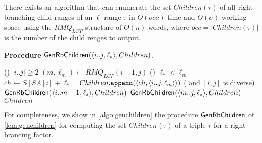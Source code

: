 \begin{lemma}\label{lem:genchildren}
  There exists an algorithm that can enumerate the set $Children(\tau)$ of all right-branching child ranges of an $\ell$-range $\tau$ in $O(occ)$ time and $O(\sigma)$ working space using the $RMQ_{LCP}$ structure of $O(n)$ words, 
where $occ = |Children(\tau)|$ is the number of the child renges to output.  
\end{lemma}

{
\setlength{\algotitleheightrule}{0pt}%
\begin{algorithm}[t]
  \caption{
    \textbf{Procedure} $\textsf{GenRbChildren}_{}(\langle i..j, \ell_*\rangle, Children)$.  
  }\label{algo:genchildren}
      \If  ()
           {$|i..j| \ge 2$}
      {
        $(m, \ell_m) \gets RMQ_{LCP}(i+1, j)$
        \uIf () {$\ell_* < \ell_m$}{
          $ch \gets S[SA[i]+\ell_*]$
          \label{line:genchildren:compute:ch}
          $Children.\mathtt{append}(\langle ch, \langle i..j, \ell_m\rangle\rangle)$
        }
        \Else  ( and $[i,j]$ is diverse) 
        {
          $\textsf{GenRbChildren}_{}(\langle i..m-1, \ell_*\rangle, Children)$\; 
          $\textsf{GenRbChildren}_{}(\langle m..j, \ell_*\rangle, Children)$\;
        }
      }
      \Return $Children$\;
\end{algorithm}
}

For completeness, we show in \cref{algo:genchildren} the procedure $\textsf{GenRbChildren}_{}$ of \cref{lem:genchildren} for computing the set $Children(\tau)$ of a triple $\tau$ for a right-brancing factor.  



